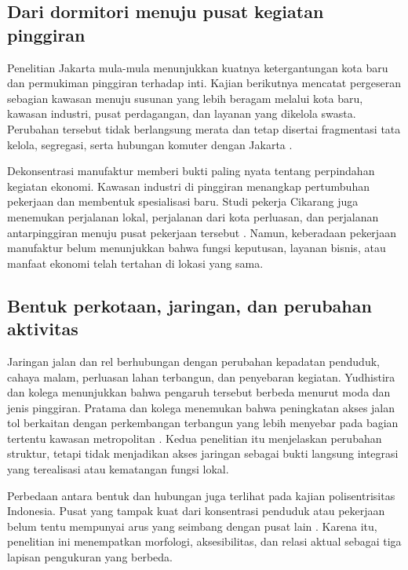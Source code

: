 \documentclass[11pt,a4paper,oneside,openany,indonesian]{report}
\begin{document}
\subsection{Dari dormitori menuju pusat kegiatan pinggiran}

Penelitian Jakarta mula-mula menunjukkan kuatnya ketergantungan kota baru dan permukiman pinggiran terhadap inti. Kajian berikutnya mencatat pergeseran sebagian kawasan menuju susunan yang lebih beragam melalui kota baru, kawasan industri, pusat perdagangan, dan layanan yang dikelola swasta. Perubahan tersebut tidak berlangsung merata dan tetap disertai fragmentasi tata kelola, segregasi, serta hubungan komuter dengan Jakarta \parencite{hudalahfirman2012,firmanfahmi2017}.

Dekonsentrasi manufaktur memberi bukti paling nyata tentang perpindahan kegiatan ekonomi. Kawasan industri di pinggiran menangkap pertumbuhan pekerjaan dan membentuk spesialisasi baru. Studi pekerja Cikarang juga menemukan perjalanan lokal, perjalanan dari kota perluasan, dan perjalanan antarpinggiran menuju pusat pekerjaan tersebut \parencite{hudalahetal2013,permatasarihudalah2013}. Namun, keberadaan pekerjaan manufaktur belum menunjukkan bahwa fungsi keputusan, layanan bisnis, atau manfaat ekonomi telah tertahan di lokasi yang sama.

\subsection{Bentuk perkotaan, jaringan, dan perubahan aktivitas}

Jaringan jalan dan rel berhubungan dengan perubahan kepadatan penduduk, cahaya malam, perluasan lahan terbangun, dan penyebaran kegiatan. Yudhistira dan kolega menunjukkan bahwa pengaruh tersebut berbeda menurut moda dan jenis pinggiran. Pratama dan kolega menemukan bahwa peningkatan akses jalan tol berkaitan dengan perkembangan terbangun yang lebih menyebar pada bagian tertentu kawasan metropolitan \parencite{yudhistiraetal2019,pratamaetal2022}. Kedua penelitian itu menjelaskan perubahan struktur, tetapi tidak menjadikan akses jaringan sebagai bukti langsung integrasi yang terealisasi atau kematangan fungsi lokal.

Perbedaan antara bentuk dan hubungan juga terlihat pada kajian polisentrisitas Indonesia. Pusat yang tampak kuat dari konsentrasi penduduk atau pekerjaan belum tentu mempunyai arus yang seimbang dengan pusat lain \parencite{sadewoetal2021}. Karena itu, penelitian ini menempatkan morfologi, aksesibilitas, dan relasi aktual sebagai tiga lapisan pengukuran yang berbeda.
\end{document}
